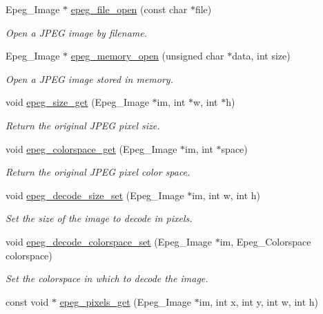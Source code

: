 \begin{DoxyCompactItemize}
\item 
Epeg\-\_\-\-Image $\ast$ \hyperlink{epeg_8c_ac046eceb33af487e670a6b18d15ccae7}{epeg\-\_\-file\-\_\-open} (const char $\ast$file)
\begin{DoxyCompactList}\small\item\em Open a J\-P\-E\-G image by filename. \end{DoxyCompactList}\item 
Epeg\-\_\-\-Image $\ast$ \hyperlink{epeg_8c_a9df9756f2e34e67701e7d88bcb43fd16}{epeg\-\_\-memory\-\_\-open} (unsigned char $\ast$data, int size)
\begin{DoxyCompactList}\small\item\em Open a J\-P\-E\-G image stored in memory. \end{DoxyCompactList}\item 
void \hyperlink{epeg_8c_a3b8680bdbf470d1a634618e5308ce147}{epeg\-\_\-size\-\_\-get} (Epeg\-\_\-\-Image $\ast$im, int $\ast$w, int $\ast$h)
\begin{DoxyCompactList}\small\item\em Return the original J\-P\-E\-G pixel size. \end{DoxyCompactList}\item 
void \hyperlink{epeg_8c_a290a722dddc53761d213524ce0e89284}{epeg\-\_\-colorspace\-\_\-get} (Epeg\-\_\-\-Image $\ast$im, int $\ast$space)
\begin{DoxyCompactList}\small\item\em Return the original J\-P\-E\-G pixel color space. \end{DoxyCompactList}\item 
void \hyperlink{epeg_8c_a800dc04316740427b1f4366d973ff4e4}{epeg\-\_\-decode\-\_\-size\-\_\-set} (Epeg\-\_\-\-Image $\ast$im, int w, int h)
\begin{DoxyCompactList}\small\item\em Set the size of the image to decode in pixels. \end{DoxyCompactList}\item 
void \hyperlink{epeg_8c_afe41e06c6667542ad4685730538e03f7}{epeg\-\_\-decode\-\_\-colorspace\-\_\-set} (Epeg\-\_\-\-Image $\ast$im, Epeg\-\_\-\-Colorspace colorspace)
\begin{DoxyCompactList}\small\item\em Set the colorspace in which to decode the image. \end{DoxyCompactList}\item 
const void $\ast$ \hyperlink{epeg_8c_aa3e359181a6a48bd84708828364bf094}{epeg\-\_\-pixels\-\_\-get} (Epeg\-\_\-\-Image $\ast$im, int x, int y, int w, int h)

\end{DoxyCompactItemize}
